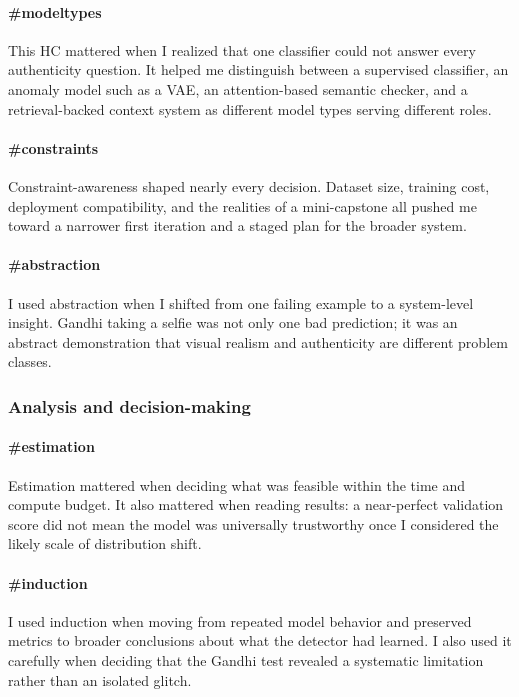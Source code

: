 \documentclass[11pt]{article}
\begin{document}
\paragraph{\#modeltypes}
This HC mattered when I realized that one classifier could not answer every authenticity question. It helped me distinguish between a supervised classifier, an anomaly model such as a VAE, an attention-based semantic checker, and a retrieval-backed context system as different model types serving different roles.

\paragraph{\#constraints}
Constraint-awareness shaped nearly every decision. Dataset size, training cost, deployment compatibility, and the realities of a mini-capstone all pushed me toward a narrower first iteration and a staged plan for the broader system.

\paragraph{\#abstraction}
I used abstraction when I shifted from one failing example to a system-level insight. Gandhi taking a selfie was not only one bad prediction; it was an abstract demonstration that visual realism and authenticity are different problem classes.

\subsubsection*{Analysis and decision-making}
\paragraph{\#estimation}
Estimation mattered when deciding what was feasible within the time and compute budget. It also mattered when reading results: a near-perfect validation score did not mean the model was universally trustworthy once I considered the likely scale of distribution shift.

\paragraph{\#induction}
I used induction when moving from repeated model behavior and preserved metrics to broader conclusions about what the detector had learned. I also used it carefully when deciding that the Gandhi test revealed a systematic limitation rather than an isolated glitch.
\end{document}
